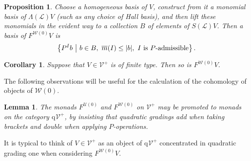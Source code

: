 \documentclass[11pt]{amsart} \renewcommand{\baselinestretch}{1.2}
\theoremstyle{plain}
\newtheorem{lem}[thm]{Lemma}
\newtheorem{prop}[thm]{Proposition}
\newtheorem{cor}[thm]{Corollary}
\numberwithin{equation}{section} %
\theoremstyle{plain}
\newtheorem{lem}[thm]{Lemma}
\newtheorem{prop}[thm]{Proposition}
\newtheorem{cor}[thm]{Corollary}
\numberwithin{equation}{chapter} %
\newcommand{\scrL}{\mathscr{L}}
\newcommand{\calU}{\mathcal{U}}
\newcommand{\calV}{\mathcal{V}}
\newcommand{\calw}{\mathcal{W}}
\newcommand{\LieOperad}{{\scrL}}
\newcommand{\vect}[2]{\calV^{#1}_{#2}}
\newcommand{\quadgrad}[1]{\mathrm{q}_{#1}}
\newcommand{\minDimP}{\overline{m}}
\begin{document}
\begin{Constructing cohomology operations}
\begin{prop}
Choose a homogeneous basis of $V$, construct from it a monomial  basis of $\Lambda(\LieOperad)V$ (such as any choice of Hall basis), and then lift these monomials in the evident way to a collection $B$ of elements of $S(\LieOperad)V$. Then a basis of $F^{\calw(0)}V$ is 
\[\left\{P^Ib\ \middle|\ b\in B,\ \minDimP(I)\leq|b|,\ \textup{$I$ is $P$-admissible}\right\}.\]
\end{prop}
\begin{cor}
\label{finite type pres by FW0}
Suppose that $V\in\vect{+}{}$ is of finite type. Then so is $F^{\calw(0)}V$.
\end{cor}

The following observations will be useful for the calculation of the cohomology of objects of $\calw(0)$.
\begin{lem}
\label{quad gradings have a chance on U0 W0}
The monads $F^{\calU(0)}$ and $F^{\calw(0)}$ on $\vect{+}{}$ may be promoted to monads on the category $\quadgrad{}\vect{+}{}$, by insisting that quadratic gradings add when taking brackets and double when applying $P$-operations.
\end{lem}
\noindent It is typical to think of $V\in\vect{+}{}$ as an object of $\quadgrad{}\vect{+}{}$ concentrated in quadratic grading one when considering $F^{\calw(0)}V$.



\end{Constructing cohomology operations}
\end{document}
